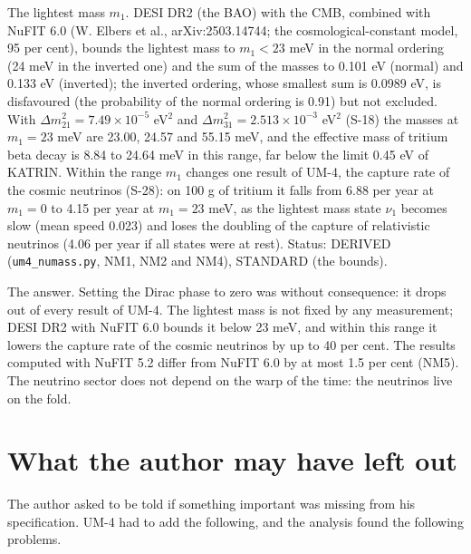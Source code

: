 \documentclass[
  10pt,
]{article}
\begin{document}
The lightest mass \(m_1\). DESI DR2 (the BAO) with the CMB, combined
with NuFIT 6.0 (W. Elbers et al., arXiv:2503.14744; the
cosmological-constant model, 95 per cent), bounds the lightest mass to
\(m_1 < 23\) meV in the normal ordering (24 meV in the inverted one) and
the sum of the masses to 0.101 eV (normal) and 0.133 eV (inverted); the
inverted ordering, whose smallest sum is 0.0989 eV, is disfavoured (the
probability of the normal ordering is 0.91) but not excluded. With
\(\Delta m^2_{21} = 7.49\times10^{-5}\) eV\(^2\) and
\(\Delta m^2_{31} = 2.513\times10^{-3}\) eV\(^2\) (S-18) the masses at
\(m_1 = 23\) meV are 23.00, 24.57 and 55.15 meV, and the effective mass
of tritium beta decay is 8.84 to 24.64 meV in this range, far below the
limit 0.45 eV of KATRIN. Within the range \(m_1\) changes one result of
UM-4, the capture rate of the cosmic neutrinos (S-28): on 100 g of
tritium it falls from 6.88 per year at \(m_1 = 0\) to 4.15 per year at
\(m_1 = 23\) meV, as the lightest mass state \(\nu_1\) becomes slow
(mean speed 0.023) and loses the doubling of the capture of relativistic
neutrinos (4.06 per year if all states were at rest). Status: DERIVED
(\texttt{um4\_numass.py}, NM1, NM2 and NM4), STANDARD (the bounds).

The answer. Setting the Dirac phase to zero was without consequence: it
drops out of every result of UM-4. The lightest mass is not fixed by any
measurement; DESI DR2 with NuFIT 6.0 bounds it below 23 meV, and within
this range it lowers the capture rate of the cosmic neutrinos by up to
40 per cent. The results computed with NuFIT 5.2 differ from NuFIT 6.0
by at most 1.5 per cent (NM5). The neutrino sector does not depend on
the warp of the time: the neutrinos live on the fold.

\hypertarget{what-the-author-may-have-left-out}{%
\section{What the author may have left
out}\label{what-the-author-may-have-left-out}}

The author asked to be told if something important was missing from his
specification. UM-4 had to add the following, and the analysis found the
following problems.
\end{document}
